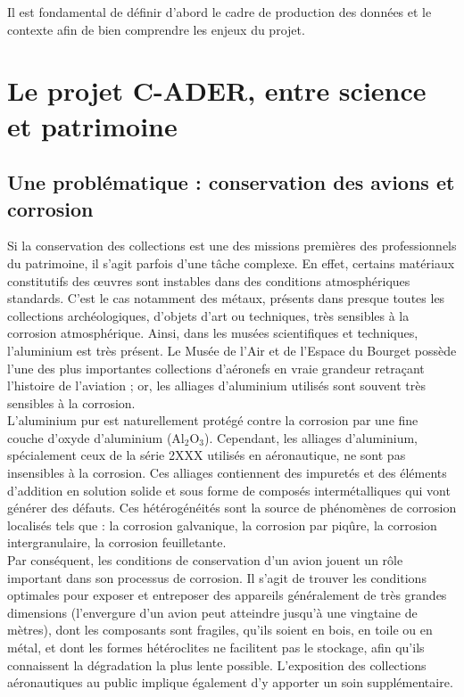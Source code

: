 
Il est fondamental de définir d'abord le cadre de production des données et le contexte afin de bien comprendre les enjeux du projet.

    \section{Le projet C-ADER, entre science et patrimoine}
        \subsection{Une problématique : conservation des avions et corrosion}

Si la conservation des collections est une des missions premières des professionnels du patrimoine, il s’agit parfois d’une tâche complexe. En effet, certains matériaux constitutifs des œuvres sont instables dans des conditions atmosphériques standards. C’est le cas notamment des métaux, présents dans presque toutes les collections archéologiques, d’objets d’art ou techniques, très sensibles à la corrosion atmosphérique. Ainsi, dans les musées scientifiques et techniques, l'aluminium est très présent. Le Musée de l'Air et de l'Espace du Bourget possède l'une des plus importantes collections d'aéronefs en vraie grandeur retraçant l'histoire de l'aviation ; or, les alliages d'aluminium utilisés sont souvent très sensibles à la corrosion.\\

L'aluminium pur est naturellement protégé contre la corrosion par une fine couche d'oxyde d'aluminium (Al$_2$O$_3$). Cependant, les alliages d’aluminium, spécialement ceux de la série 2XXX utilisés en aéronautique, ne sont pas insensibles à la corrosion. Ces alliages contiennent des impuretés et des éléments d’addition en solution solide et sous forme de composés intermétalliques qui vont générer des défauts. Ces hétérogénéités sont la source de phénomènes de corrosion localisés tels que : la corrosion galvanique, la corrosion par piqûre, la corrosion intergranulaire, la corrosion feuilletante.\\

Par conséquent, les conditions de conservation d’un avion jouent un rôle important dans son processus de corrosion. Il s'agit de trouver les conditions optimales pour exposer et entreposer des appareils généralement de très grandes dimensions (l'envergure d'un avion peut atteindre jusqu'à une vingtaine de mètres), dont les composants sont fragiles, qu'ils soient en bois, en toile ou en métal, et dont les formes hétéroclites ne facilitent pas le stockage, afin qu’ils connaissent la dégradation la plus lente possible. L’exposition des collections aéronautiques au public implique également d’y apporter un soin supplémentaire.\\

